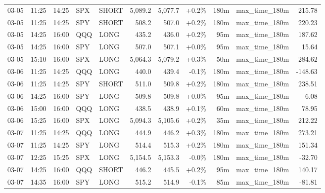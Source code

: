\documentclass[11pt,a4paper,twoside]{article}
\begin{document}
\begin{center}
\begin{longtable}{>{\color{txtmain}}l l l l l r r r r >{\color{txtmain}}l r}
03-05 & 11:25 & 14:25 & SPX & SHORT & 5,089.2 & 5,077.7 & \textcolor{wingreen}{+0.2\%} & 180m & max\_time\_180m & \textcolor{wingreen}{215.78} \\
03-05 & 11:25 & 14:25 & SPY & SHORT & 508.2 & 507.0 & \textcolor{wingreen}{+0.2\%} & 180m & max\_time\_180m & \textcolor{wingreen}{220.23} \\
03-05 & 14:25 & 16:00 & QQQ & LONG & 435.2 & 436.0 & \textcolor{wingreen}{+0.2\%} & 95m & max\_time\_180m & \textcolor{wingreen}{187.62} \\
03-05 & 14:25 & 16:00 & SPY & LONG & 507.0 & 507.1 & \textcolor{wingreen}{+0.0\%} & 95m & max\_time\_180m & \textcolor{wingreen}{15.64} \\
03-05 & 15:10 & 16:00 & SPX & LONG & 5,064.3 & 5,079.2 & \textcolor{wingreen}{+0.3\%} & 50m & max\_time\_180m & \textcolor{wingreen}{284.62} \\
03-06 & 11:25 & 14:25 & QQQ & LONG & 440.0 & 439.4 & \textcolor{lossred}{-0.1\%} & 180m & max\_time\_180m & \textcolor{lossred}{-148.63} \\
03-06 & 11:25 & 14:25 & SPY & SHORT & 511.0 & 509.8 & \textcolor{wingreen}{+0.2\%} & 180m & max\_time\_180m & \textcolor{wingreen}{238.51} \\
03-06 & 14:25 & 16:00 & SPY & LONG & 509.8 & 509.8 & \textcolor{wingreen}{+0.0\%} & 95m & max\_time\_180m & \textcolor{lossred}{-6.08} \\
03-06 & 15:00 & 16:00 & QQQ & LONG & 438.5 & 438.9 & \textcolor{wingreen}{+0.1\%} & 60m & max\_time\_180m & \textcolor{wingreen}{78.95} \\
03-06 & 15:25 & 16:00 & SPX & LONG & 5,094.3 & 5,105.6 & \textcolor{wingreen}{+0.2\%} & 35m & max\_time\_180m & \textcolor{wingreen}{212.22} \\
03-07 & 11:25 & 14:25 & QQQ & LONG & 444.9 & 446.2 & \textcolor{wingreen}{+0.3\%} & 180m & max\_time\_180m & \textcolor{wingreen}{273.21} \\
03-07 & 11:25 & 14:25 & SPY & LONG & 514.4 & 515.3 & \textcolor{wingreen}{+0.2\%} & 180m & max\_time\_180m & \textcolor{wingreen}{151.34} \\
03-07 & 12:25 & 15:25 & SPX & LONG & 5,154.5 & 5,153.3 & \textcolor{lossred}{-0.0\%} & 180m & max\_time\_180m & \textcolor{lossred}{-32.70} \\
03-07 & 14:25 & 16:00 & QQQ & SHORT & 446.2 & 445.5 & \textcolor{wingreen}{+0.2\%} & 95m & max\_time\_180m & \textcolor{wingreen}{140.17} \\
03-07 & 14:35 & 16:00 & SPY & LONG & 515.2 & 514.9 & \textcolor{lossred}{-0.1\%} & 85m & max\_time\_180m & \textcolor{lossred}{-81.81} \\

\end{longtable}
\end{center}
\end{document}
